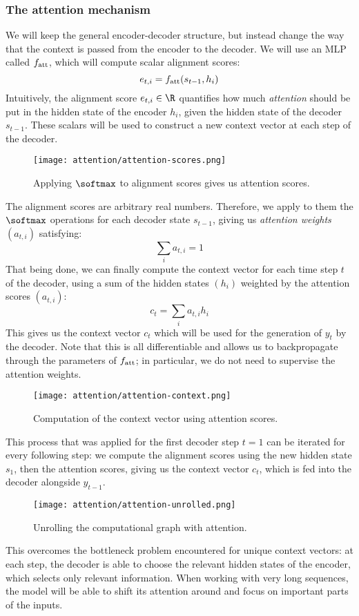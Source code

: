 \subsubsection{The attention mechanism}
We will keep the general encoder-decoder structure, but instead change the way that the context is passed from the encoder to the decoder. We will use an MLP called $f_{\textnormal{att}}$, which will compute scalar alignment scores:
\begin{equation*}
    e_{t,i} = f_{\textnormal{att}}(s_{t-1}, h_i)
\end{equation*}
Intuitively, the alignment score $e_{t,i}\in\R$ quantifies how much \emph{attention} should be put in the hidden state of the encoder $h_i$, given the hidden state of the decoder $s_{t-1}$. These scalars will be used to construct a new context vector at each step of the decoder.

\begin{figure}[H]
    \centering
    \texttt{[image: attention/attention-scores.png]}
    \caption{Applying $\softmax$ to alignment scores gives us attention scores.}
\end{figure}

The alignment scores are arbitrary real numbers. Therefore, we apply to them the $\softmax$ operations for each decoder state $s_{t-1}$, giving us \emph{attention weights} $(a_{t,i})$ satisfying:
\begin{equation*}
    \sum_i a_{t,i} = 1 
\end{equation*}
That being done, we can finally compute the context vector for each time step $t$ of the decoder, using a sum of the hidden states $(h_i)$ weighted by the attention scores $(a_{t,i})$:
\begin{equation*}
    c_t = \sum_i a_{t,i} h_i
\end{equation*}
This gives us the context vector $c_t$ which will be used for the generation of $y_t$ by the decoder. Note that this is all differentiable and allows us to backpropagate through the parameters of $f_{\textnormal{att}}$; in particular, we do not need to supervise the attention weights.
\begin{figure}[H]
    \centering
    \texttt{[image: attention/attention-context.png]}
    \caption{Computation of the context vector using attention scores.}
\end{figure}
This process that was applied for the first decoder step $t=1$ can be iterated for every following step: we compute the alignment scores using the new hidden state $s_1$, then the attention scores, giving us the context vector $c_t$, which is fed into the decoder alongside $y_{t-1}$.
\begin{figure}[H]
    \centering
    \texttt{[image: attention/attention-unrolled.png]}
    \caption{Unrolling the computational graph with attention.}
\end{figure}
This overcomes the bottleneck problem encountered for unique context vectors: at each step, the decoder is able to choose the relevant hidden states of the encoder, which selects only relevant information. When working with very long sequences, the model will be able to shift its attention around and focus on important parts of the inputs.

